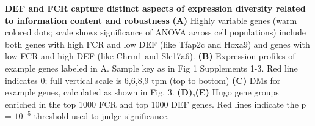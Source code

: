 \textbf{DEF and FCR capture distinct aspects of expression diversity related to information content and robustness} \textbf{(A)} Highly variable genes (warm colored dots; scale shows significance of ANOVA across cell populations) include both genes with high FCR and low DEF (like Tfap2c and Hoxa9) and genes with low FCR and high DEF (like Chrm1 and Slc17a6). \textbf{(B)} Expression profiles of example genes labeled in A. Sample key as in Fig 1 Supplements 1-3. Red line indicates 0; full vertical scale is 6,6,8,9 tpm (top to bottom) \textbf{(C)} DMs for example genes, calculated as shown in Fig. 3. \textbf{(D),(E)} Hugo gene groups enriched in the top 1000 FCR and top 1000 DEF genes. Red lines indicate the p = $10^{-5}$ threshold used to judge significance.
